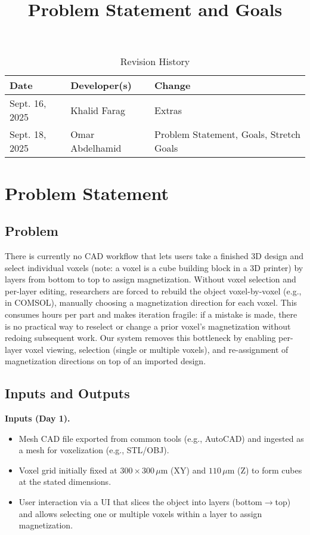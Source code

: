 \documentclass{article}
\title{Problem Statement and Goals\\\progname}
\author{\authname}
\date{}
\begin{document}
\maketitle

\begin{table}[hp]
\caption{Revision History} \label{TblRevisionHistory}
\begin{tabularx}{\textwidth}{llX}
\toprule
\textbf{Date} & \textbf{Developer(s)} & \textbf{Change}\\
\midrule
Sept. 16, 2025 & Khalid Farag & Extras\\
Sept. 18, 2025 & Omar Abdelhamid & Problem Statement, Goals, Stretch Goals\\
\bottomrule
\end{tabularx}
\end{table}

\section{Problem Statement}


\subsection{Problem}
There is currently no CAD workflow that lets users take a finished 3D design and
select individual voxels (note: a voxel is a cube building block in a 3D printer) by layers from bottom to top to assign
magnetization. Without voxel selection and per-layer editing, researchers are
forced to rebuild the object voxel-by-voxel (e.g., in COMSOL), manually choosing
a magnetization direction for each voxel. This consumes hours per part and
makes iteration fragile: if a mistake is made, there is no practical way to
reselect or change a prior voxel’s magnetization without redoing subsequent work.
Our system removes this bottleneck by enabling per-layer voxel viewing,
selection (single or multiple voxels), and re-assignment of magnetization
directions on top of an imported design.


\subsection{Inputs and Outputs}
\textbf{Inputs (Day 1).}
\begin{itemize}
  \item Mesh CAD file exported from common tools (e.g., AutoCAD) and ingested as a mesh for voxelization (e.g., STL/OBJ).
  \item Voxel grid initially fixed at $300 \times 300\,\mu\text{m}$ (XY) and $110\,\mu\text{m}$ (Z) to form cubes at the stated dimensions.
  \item User interaction via a UI that slices the object into layers (bottom$\rightarrow$top) and allows selecting one or multiple voxels within a layer to assign magnetization.
\end{itemize}
\end{document}
